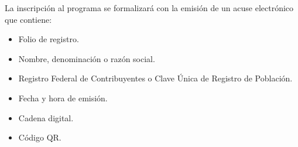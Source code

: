     
    La inscripción al programa se formalizará con la emisión de un acuse electrónico que contiene:
    \begin{itemize}
        \item  Folio de registro. 
        \item Nombre, denominación o razón social. 
        \item Registro Federal de Contribuyentes o Clave Única de Registro de Población. 
        \item Fecha y hora de emisión. 
        \item Cadena digital. 
        \item Código QR. 
    \end{itemize}    
\bigskip
